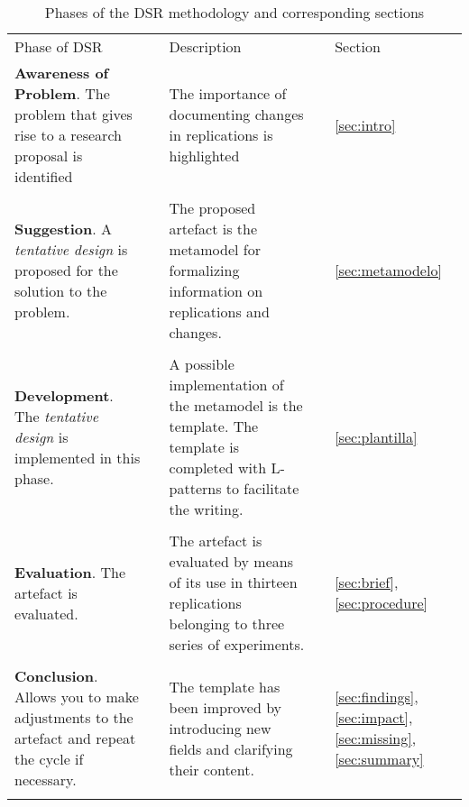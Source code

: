 
\begin{table}[h]
  \caption{Phases of the DSR methodology \cite{Vaishnavi} and corresponding sections}
\label{tab:fases}
  \centering
	\scriptsize
\begin{tabularx}{0.9\textwidth}{
  >{\hsize=0.88\hsize}X
  >{\hsize=0.02\hsize}X
  >{\hsize=0.88\hsize}X
  >{\hsize=0.02\hsize}X
  >{\hsize=0.20\hsize}X}
  
	\hline\noalign{\smallskip}
		
    
    Phase of DSR & &
    Description  & &
    Section \\

	\noalign{\smallskip}\hline\noalign{\smallskip}

    \textbf{Awareness of Problem}. The problem that gives rise to a research proposal is identified & & The importance of documenting changes in replications is highlighted & & 
    \ref{sec:intro}  \\ \\
    
    \textbf{Suggestion}.  A \emph{tentative design} is proposed for the solution to the problem. & & The proposed artefact is the metamodel for formalizing information on replications and changes.& & \ref{sec:metamodelo} \\ \\
    
    \textbf{Development}. The \emph{tentative design} is implemented in this phase. & &
    A possible implementation of the metamodel is the template. The template is completed with L-patterns to facilitate the writing. & &
    \ref{sec:plantilla} \\ \\
    
    \textbf{Evaluation}. The artefact is evaluated. & &
    The artefact is evaluated by means of its use in thirteen replications belonging to three series of experiments. & & 
    \ref{sec:brief}, \ref{sec:procedure} \\ \\

    \textbf{Conclusion}. Allows you to make adjustments to the artefact and repeat the cycle if necessary. & & The  template has  been  improved  by  introducing  new  fields  and  clarifying  their content. & & \ref{sec:findings},  \ref{sec:impact}, \ref{sec:missing}, \ref{sec:summary}   \\ 

	\noalign{\smallskip\smallskip}\hline
	\end{tabularx}  
\end{table}
